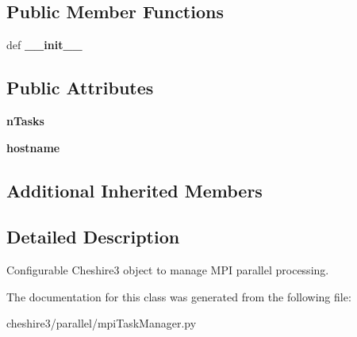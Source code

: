 \subsection*{Public Member Functions}
\begin{DoxyCompactItemize}
\item 
\hypertarget{classcheshire3_1_1parallel_1_1mpi_task_manager_1_1_m_p_i_task_manager_a0c93c9b9ab9a3b81d51cdc87e6935025}{def {\bfseries \-\_\-\-\_\-init\-\_\-\-\_\-}}\label{classcheshire3_1_1parallel_1_1mpi_task_manager_1_1_m_p_i_task_manager_a0c93c9b9ab9a3b81d51cdc87e6935025}

\end{DoxyCompactItemize}
\subsection*{Public Attributes}
\begin{DoxyCompactItemize}
\item 
\hypertarget{classcheshire3_1_1parallel_1_1mpi_task_manager_1_1_m_p_i_task_manager_abc110a7b539f9bc0c8c4bd6779e2bfc1}{{\bfseries n\-Tasks}}\label{classcheshire3_1_1parallel_1_1mpi_task_manager_1_1_m_p_i_task_manager_abc110a7b539f9bc0c8c4bd6779e2bfc1}

\item 
\hypertarget{classcheshire3_1_1parallel_1_1mpi_task_manager_1_1_m_p_i_task_manager_ac8db0d8d06a4a2ececc5f0a86e209cf1}{{\bfseries hostname}}\label{classcheshire3_1_1parallel_1_1mpi_task_manager_1_1_m_p_i_task_manager_ac8db0d8d06a4a2ececc5f0a86e209cf1}

\end{DoxyCompactItemize}
\subsection*{Additional Inherited Members}


\subsection{Detailed Description}
\begin{DoxyVerb}Configurable Cheshire3 object to manage MPI parallel processing.\end{DoxyVerb}
 

The documentation for this class was generated from the following file\-:\begin{DoxyCompactItemize}
\item 
cheshire3/parallel/mpi\-Task\-Manager.\-py\end{DoxyCompactItemize}
